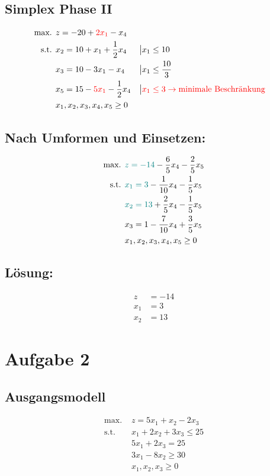 \documentclass[a4paper,11pt]{article}
\begin{document}
\subsection*{Simplex Phase II}
\begin{align*}
\text{max. } & z = -20 + {\color{red} 2x_1} - x_4 \\
\text{s.t. } & x_2 = 10 + x_1 + \frac{1}{2}x_4 &&\big| x_1 \le 10 \\
& x_3 = 10 - 3x_1 - x_4 &&\big| x_1 \le \frac{10}{3} \\
& x_5 = 15 - {\color{red} 5x_1} - \frac{1}{2}x_4 &&\big| \color{red} x_1 \le 3 \to \text{minimale Beschränkung} \\
& x_1, x_2, x_3, x_4, x_5 \ge 0
\end{align*}

\subsection*{Nach Umformen und Einsetzen:}
\begin{align*}
\text{max. } & {\color{teal} z = -14} - \frac{6}{5}x_4 - \frac{2}{5}x_5 \\
\text{s.t. } & {\color{teal} x_1 = 3} - \frac{1}{10}x_4 - \frac{1}{5}x_5 \\
& {\color{teal} x_2 = 13} + \frac{2}{5}x_4 - \frac{1}{5}x_5 \\
& x_3 = 1 - \frac{7}{10}x_4 + \frac{3}{5}x_5 \\
& x_1, x_2, x_3, x_4, x_5 \ge 0
\end{align*}

\subsection*{Lösung:}
\begin{align*}
z &= -14 \\
x_1 &= 3 \\
x_2 &= 13
\end{align*}


\section*{Aufgabe 2}
\subsection*{Ausgangsmodell}
\begin{align*}
\text{max. } & z = 5x_1 + x_2 - 2x_3 \\
\text{s.t. } & x_1 + 2x_2 + 3x_3 \le 25 \\
& 5x_1 + 2x_3 = 25 \\
& 3x_1 - 8x_2 \ge 30 \\
& x_1, x_2, x_3 \ge 0
\end{align*}
\end{document}
